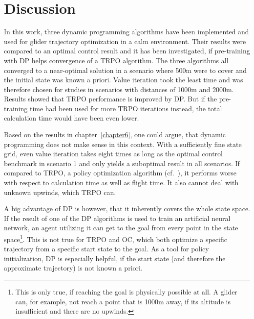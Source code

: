 \chapter{Discussion}

In this work, three dynamic programming algorithms have been implemented and used for glider trajectory optimization in a calm environment. Their results were compared to an optimal control result and it has been investigated, if pre-training with DP helps convergence of a TRPO algorithm. The three algorithms all converged to a near-optimal solution in a scenario where 500m were to cover and the initial state was known a priori. Value iteration took the least time and was therefore chosen for studies in scenarios with distances of 1000m and 2000m. Results showed that TRPO performance is improved by DP. But if the pre-training time had been used for more TRPO iterations instead, the total calculation time would have been even lower.

Based on the results in chapter~\ref{chapter6}, one could argue, that dynamic programming does not make sense in this context. With a sufficiently fine state grid, even value iteration takes eight times as long as the optimal control benchmark in scenario 1 and only yields a suboptimal result in all scenarios. If compared to TRPO, a policy optimization algorithm (cf.~\cite{Zuern2017}), it performs worse with respect to calculation time as well as flight time. It also cannot deal with unknown upwinds, which TRPO can.

A big advantage of DP is however, that it inherently covers the whole state space. If the result of one of the DP algorithms is used to train an artificial neural network, an agent utilizing it can get to the goal from every point in the state space\footnote{This is only true, if reaching the goal is physically possible at all. A glider can, for example, not reach a point that is 1000m away, if its altitude is insufficient and there are no upwinds.}. This is not true for TRPO and OC, which both optimize a specific trajectory from a specific start state to the goal. As a tool for policy initialization, DP is especially helpful, if the start state (and therefore the approximate trajectory) is not known a priori.

